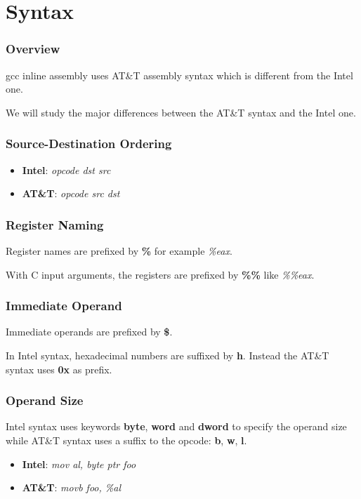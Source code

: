 %
%

\section{Syntax}


\begin{frame}
  \frametitle{Overview}

  gcc inline assembly uses AT\&T assembly syntax which is
  different from the Intel one.

  \-

  We will study the major differences between the AT\&T syntax and the
  Intel one.
\end{frame}


\begin{frame}
  \frametitle{Source-Destination Ordering}

  \begin{itemize}
    \item
      \textbf{Intel}: \textit{opcode dst src}
    \item
      \textbf{AT\&T}: \textit{opcode src dst}
  \end{itemize}
\end{frame}


\begin{frame}
  \frametitle{Register Naming}

  Register names are prefixed by \textbf{\%} for example \textit{\%eax}.

  \-

  With C input arguments, the registers are prefixed by \textbf{\%\%}
  like \textit{\%\%eax}.
\end{frame}


\begin{frame}
  \frametitle{Immediate Operand}

  Immediate operands are prefixed by \textbf{\$}.

  \-

  In Intel syntax, hexadecimal numbers are suffixed by \textbf{h}.
  Instead the AT\&T syntax uses \textbf{0x} as prefix.
\end{frame}


\begin{frame}
  \frametitle{Operand Size}

  Intel syntax uses keywords \textbf{byte}, \textbf{word} and
  \textbf{dword} to specify the operand size while AT\&T syntax uses
  a suffix to the opcode: \textbf{b}, \textbf{w}, \textbf{l}.

  \begin{itemize}
    \item
      \textbf{Intel}: \textit{mov al, byte ptr foo}
    \item
      \textbf{AT\&T}: \textit{movb foo, \%al}
  \end{itemize}
\end{frame}

